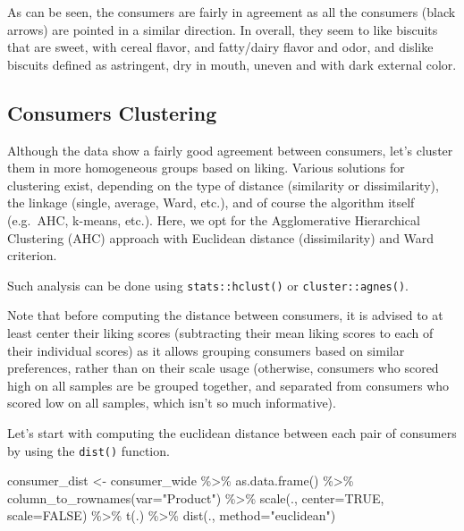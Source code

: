 \documentclass[
]{book}
\newenvironment{Shaded}{\begin{snugshade}}{\end{snugshade}}
\newcommand{\AttributeTok}[1]{\textcolor[rgb]{0.77,0.63,0.00}{#1}}
\newcommand{\ConstantTok}[1]{\textcolor[rgb]{0.00,0.00,0.00}{#1}}
\newcommand{\FunctionTok}[1]{\textcolor[rgb]{0.00,0.00,0.00}{#1}}
\newcommand{\NormalTok}[1]{#1}
\newcommand{\OtherTok}[1]{\textcolor[rgb]{0.56,0.35,0.01}{#1}}
\newcommand{\SpecialCharTok}[1]{\textcolor[rgb]{0.00,0.00,0.00}{#1}}
\newcommand{\StringTok}[1]{\textcolor[rgb]{0.31,0.60,0.02}{#1}}
\begin{document}
As can be seen, the consumers are fairly in agreement as all the consumers (black arrows) are pointed in a similar direction.
In overall, they seem to like biscuits that are sweet, with cereal flavor, and fatty/dairy flavor and odor, and dislike biscuits defined as astringent, dry in mouth, uneven and with dark external color.

\hypertarget{consumers-clustering}{%
\subsection{Consumers Clustering}\label{consumers-clustering}}

Although the data show a fairly good agreement between consumers, let's cluster them in more homogeneous groups based on liking.
Various solutions for clustering exist, depending on the type of distance (similarity or dissimilarity), the linkage (single, average, Ward, etc.), and of course the algorithm itself (e.g.~AHC, k-means, etc.).
Here, we opt for the Agglomerative Hierarchical Clustering (AHC) approach with Euclidean distance (dissimilarity) and Ward criterion.

Such analysis can be done using \texttt{stats::hclust()} or \texttt{cluster::agnes()}.

Note that before computing the distance between consumers, it is advised to at least center their liking scores (subtracting their mean liking scores to each of their individual scores) as it allows grouping consumers based on similar preferences, rather than on their scale usage (otherwise, consumers who scored high on all samples are be grouped together, and separated from consumers who scored low on all samples, which isn't so much informative).

Let's start with computing the euclidean distance between each pair of consumers by using the \texttt{dist()} function.

\begin{Shaded}
\begin{Highlighting}[]
\NormalTok{consumer\_dist }\OtherTok{\textless{}{-}}\NormalTok{ consumer\_wide }\SpecialCharTok{\%\textgreater{}\%} 
  \FunctionTok{as.data.frame}\NormalTok{() }\SpecialCharTok{\%\textgreater{}\%} 
  \FunctionTok{column\_to\_rownames}\NormalTok{(}\AttributeTok{var=}\StringTok{"Product"}\NormalTok{) }\SpecialCharTok{\%\textgreater{}\%} 
  \FunctionTok{scale}\NormalTok{(., }\AttributeTok{center=}\ConstantTok{TRUE}\NormalTok{, }\AttributeTok{scale=}\ConstantTok{FALSE}\NormalTok{) }\SpecialCharTok{\%\textgreater{}\%} 
  \FunctionTok{t}\NormalTok{(.) }\SpecialCharTok{\%\textgreater{}\%} 
  \FunctionTok{dist}\NormalTok{(., }\AttributeTok{method=}\StringTok{"euclidean"}\NormalTok{)}
\end{Highlighting}
\end{Shaded}
\end{document}
